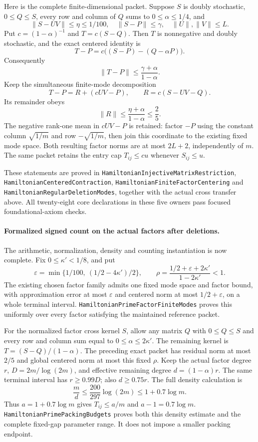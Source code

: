 Here is the complete finite-dimensional packet.
Suppose \(S\) is doubly stochastic, \(0\leq Q\leq S\),
every row and column of \(Q\) sums to
\(0\leq\alpha\leq1/4\), and
\[
 \|S-UV\|\leq\eta\leq1/100,\quad
 \|S-P\|\leq\gamma,\quad \|U\|,\|V\|\leq L.
\]
Put \(c=(1-\alpha)^{-1}\) and \(T=c(S-Q)\).
Then \(T\) is nonnegative and doubly stochastic, and the
exact centered identity is
\[
 T-P=c\big((S-P)-(Q-\alpha P)\big).
\]
Consequently
\[
 \|T-P\|\leq\frac{\gamma+\alpha}{1-\alpha}.
\]
Keep the simultaneous finite-mode decomposition
\[
 T-P=R+(cUV-P),\qquad R=c(S-UV-Q).
\]
Its remainder obeys
\[
 \|R\|\leq\frac{\eta+\alpha}{1-\alpha}\leq\frac25.
\]
The negative rank-one mean in \(cUV-P\) is retained:
factor \(-P\) using the constant column \(\sqrt{1/m}\)
and row \(-\sqrt{1/m}\), then join this coordinate to the
existing fixed mode space. Both resulting factor norms
are at most \(2L+2\), independently of \(m\).
The same packet retains the entry cap
\(T_{ij}\leq c u\) whenever \(S_{ij}\leq u\).

These statements are proved in
\texttt{HamiltonianInjectiveMatrixRestriction},
\texttt{HamiltonianCenteredContraction},
\texttt{HamiltonianFiniteFactorCentering} and
\texttt{HamiltonianRegularDeletionModes}, together with
the actual cross transfer above. All twenty-eight core
declarations in these five owners pass focused
foundational-axiom checks.
\paragraph{Formalized signed count on the actual factors after deletions.}
The arithmetic, normalization, density and counting
instantiation is now complete.
Fix \(0\leq\kappa'<1/8\), and put
\[
 \varepsilon=\min\{1/100,\ (1/2-4\kappa')/2\},\qquad
 \rho=\frac{1/2+\varepsilon+2\kappa'}{1-2\kappa'}<1.
\]
The existing chosen factor family admits one fixed mode
space and factor bound, with approximation error at most
\(\varepsilon\) and centered norm at most
\(1/2+\varepsilon\), on a whole terminal interval.
\texttt{HamiltonianPrimeFactorFiniteModes} proves this
uniformly over every factor satisfying the maintained
reference packet.

For the normalized factor cross kernel \(S\), allow any
matrix \(Q\) with \(0\leq Q\leq S\) and every row and
column sum equal to \(0\leq\alpha\leq2\kappa'\).
The remaining kernel is \(T=(S-Q)/(1-\alpha)\).
The preceding exact packet has residual norm at most
\(2/5\) and global centered norm at most this fixed \(\rho\).
Keep the actual factor degree \(r\), \(D=2m/\log(2m)\),
and effective remaining degree \(d=(1-\alpha)r\).
The same terminal interval has \(r\geq0.99D\);
also \(d\geq0.75r\). The full density calculation is
\[
 \frac m d\leq\frac{200}{297}\log(2m)
                         \leq1+0.7\log m.
\]
Thus \(a=1+0.7\log m\) gives \(T_{ij}\leq a/m\) and
\(a-1=0.7\log m\).
\texttt{HamiltonianPrimePackingBudgets} proves both this
density estimate and the complete fixed-gap parameter
range. It does not impose a smaller packing endpoint.

